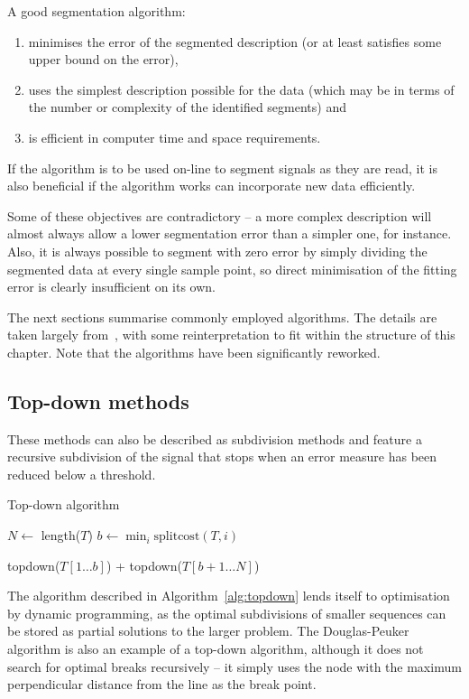 A good segmentation algorithm:
\begin{enumerate}
\item minimises the error of the segmented description (or at least
  satisfies some upper bound on the error),
\item uses the simplest description possible for the data (which may
  be in terms of the number or complexity of the identified segments) and
\item is efficient in computer time and space requirements.
\end{enumerate}
If the algorithm is to be used on-line to segment signals as they are
read, it is also beneficial if the algorithm works can incorporate new
data efficiently.

Some of these objectives are contradictory -- a more complex
description will almost always allow a lower segmentation error than a
simpler one, for instance.  Also, it is always possible to segment
with zero error by simply dividing the segmented data at every single
sample point, so direct minimisation of the fitting error is clearly
insufficient on its own.

The next sections summarise commonly employed algorithms.  The details
are taken largely from~\citet{keogh_segmenting_1993}, with some
reinterpretation to fit within the structure of this chapter.  Note
that the algorithms have been significantly reworked.

\subsection{Top-down methods}
These methods can also be described as subdivision methods and feature
a recursive subdivision of the signal that stops when an error measure
has been reduced below a threshold.
\begin{algorithm}
  \caption{Top-down algorithm}
  \label{alg:topdown}
  \begin{algorithmic}
       
    \Else
      \State $N \gets $ length($T$)
      \State $b \gets \min_i{\mathrm{splitcost}(T,i)}$ 
  
      \Return topdown($T[1\dots b]$) + topdown($T[b+1\dots N]$) 
      \EndIf
    \EndFunction
\end{algorithmic}
\end{algorithm}
The algorithm described in Algorithm~\ref{alg:topdown} lends itself to
optimisation by dynamic programming, as the optimal subdivisions of
smaller sequences can be stored as partial solutions to the larger
problem.  The Douglas-Peuker algorithm \citep{douglas_algorithms_1973} is also an example of a
top-down algorithm, although it does not search for optimal breaks
recursively -- it simply uses the node with the maximum perpendicular
distance from the line as the break point.

